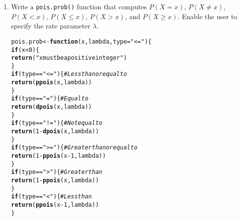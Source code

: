 \documentclass{article}\usepackage[]{graphicx}\usepackage[]{xcolor}
\makeatletter
\newcommand{\hlnum}[1]{\textcolor[rgb]{0.686,0.059,0.569}{#1}}%
\newcommand{\hlsng}[1]{\textcolor[rgb]{0.192,0.494,0.8}{#1}}%
\newcommand{\hlcom}[1]{\textcolor[rgb]{0.678,0.584,0.686}{\textit{#1}}}%
\newcommand{\hlopt}[1]{\textcolor[rgb]{0,0,0}{#1}}%
\newcommand{\hldef}[1]{\textcolor[rgb]{0.345,0.345,0.345}{#1}}%
\newcommand{\hlkwa}[1]{\textcolor[rgb]{0.161,0.373,0.58}{\textbf{#1}}}%
\newcommand{\hlkwb}[1]{\textcolor[rgb]{0.69,0.353,0.396}{#1}}%
\newcommand{\hlkwc}[1]{\textcolor[rgb]{0.333,0.667,0.333}{#1}}%
\newcommand{\hlkwd}[1]{\textcolor[rgb]{0.737,0.353,0.396}{\textbf{#1}}}%
\newenvironment{kframe}{%
 \def\at@end@of@kframe{}%
 \ifinner\ifhmode%
  \def\at@end@of@kframe{\end{minipage}}%
  \begin{minipage}{\columnwidth}%
 \fi\fi%
 \def\FrameCommand##1{\hskip\@totalleftmargin \hskip-\fboxsep
 \colorbox{shadecolor}{##1}\hskip-\fboxsep
     \hskip-\linewidth \hskip-\@totalleftmargin \hskip\columnwidth}%
 \MakeFramed {\advance\hsize-\width
   \@totalleftmargin\z@ \linewidth\hsize
   \@setminipage}}%
 {\par\unskip\endMakeFramed%
 \at@end@of@kframe}
\newenvironment{knitrout}{}{} %
\makeatother
\begin{document}
  \begin{enumerate}
    \item Write a \texttt{pois.prob()} function that computes $P(X=x)$, 
    $P(X \neq x)$, $P(X<x)$, $P(X \leq x)$, $P(X > x)$, and $P(X \geq x).$ Enable the user to specify the rate parameter $\lambda$.
\begin{knitrout}\scriptsize
{}\color{fgcolor}\begin{kframe}
\begin{alltt}
\hldef{pois.prob} \hlkwb{<-} \hlkwa{function}\hldef{(}\hlkwc{x}\hldef{,} \hlkwc{lambda}\hldef{,} \hlkwc{type}\hldef{=}\hlsng{"<="}\hldef{)\{}
  \hlkwa{if}\hldef{(x}\hlopt{<}\hlnum{0}\hldef{)\{}
    \hlkwd{return}\hldef{(}\hlsng{"x must be a positive integer"}\hldef{)}
  \hldef{\}}
  \hlkwa{if}\hldef{(type} \hlopt{==} \hlsng{"<="}\hldef{)\{}\hlcom{#Less than or equal to}
    \hlkwd{return}\hldef{(}\hlkwd{ppois}\hldef{(x,lambda))}
  \hldef{\}}
  \hlkwa{if}\hldef{(type} \hlopt{==} \hlsng{"="}\hldef{)\{}\hlcom{#Equal to}
    \hlkwd{return}\hldef{(}\hlkwd{dpois}\hldef{(x,lambda))}
  \hldef{\}}
  \hlkwa{if}\hldef{(type} \hlopt{==} \hlsng{"!="}\hldef{)\{}\hlcom{#Not equal to}
    \hlkwd{return}\hldef{(}\hlnum{1}\hlopt{-}\hlkwd{dpois}\hldef{(x,lambda))}
    \hldef{\}}
  \hlkwa{if}\hldef{(type} \hlopt{==} \hlsng{">="}\hldef{)\{}\hlcom{# Greater than or equal to}
    \hlkwd{return}\hldef{(}\hlnum{1}\hlopt{-}\hlkwd{ppois}\hldef{(x}\hlopt{-}\hlnum{1}\hldef{,lambda))}
    \hldef{\}}
  \hlkwa{if}\hldef{(type} \hlopt{==} \hlsng{">"}\hldef{)\{}\hlcom{# Greater than}
    \hlkwd{return}\hldef{(}\hlnum{1}\hlopt{-}\hlkwd{ppois}\hldef{(x,lambda))}
  \hldef{\}}
  \hlkwa{if}\hldef{(type} \hlopt{==} \hlsng{"<"}\hldef{)\{}\hlcom{#Less than}
    \hlkwd{return}\hldef{(}\hlkwd{ppois}\hldef{(x}\hlopt{-}\hlnum{1}\hldef{,lambda))}
    \hldef{\}}



\end{alltt}
\end{kframe}
\end{knitrout}
\end{enumerate}
\end{document}
